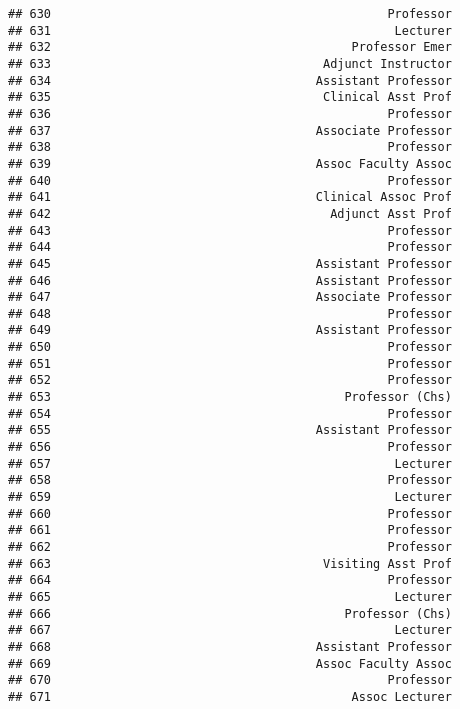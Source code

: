 \documentclass[
]{article}
\begin{document}
\begin{verbatim}
## 630                                               Professor
## 631                                                Lecturer
## 632                                          Professor Emer
## 633                                      Adjunct Instructor
## 634                                     Assistant Professor
## 635                                      Clinical Asst Prof
## 636                                               Professor
## 637                                     Associate Professor
## 638                                               Professor
## 639                                     Assoc Faculty Assoc
## 640                                               Professor
## 641                                     Clinical Assoc Prof
## 642                                       Adjunct Asst Prof
## 643                                               Professor
## 644                                               Professor
## 645                                     Assistant Professor
## 646                                     Assistant Professor
## 647                                     Associate Professor
## 648                                               Professor
## 649                                     Assistant Professor
## 650                                               Professor
## 651                                               Professor
## 652                                               Professor
## 653                                         Professor (Chs)
## 654                                               Professor
## 655                                     Assistant Professor
## 656                                               Professor
## 657                                                Lecturer
## 658                                               Professor
## 659                                                Lecturer
## 660                                               Professor
## 661                                               Professor
## 662                                               Professor
## 663                                      Visiting Asst Prof
## 664                                               Professor
## 665                                                Lecturer
## 666                                         Professor (Chs)
## 667                                                Lecturer
## 668                                     Assistant Professor
## 669                                     Assoc Faculty Assoc
## 670                                               Professor
## 671                                          Assoc Lecturer

\end{verbatim}
\end{document}
